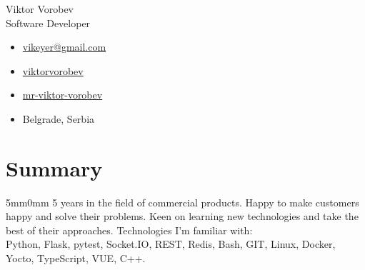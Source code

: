 \documentclass[10pt]{article}
\newcommand{\lmvalue}{5mm}
\newcommand{\rmvalue}{0mm}
\begin{document}
    \begin{minipage}{0.78\linewidth}
    {\fontsize{28pt}{28pt}\selectfont Viktor Vorobev}
        \\[1em]
        {\color{gray}\fontsize{16pt}{16pt}\selectfont Software Developer}
    \end{minipage}
    \hfill%
    \begin{minipage}{0.24\linewidth}
        \begin{flushleft}
            \begin{itemize}
                \item[\color{cyan}\faEnvelope] \href{mailto:vikeyer@gmail.com}{vikeyer@gmail.com}
                \item[\color{cyan}\faGithub] \href{https://github.com/viktorvorobev}{viktorvorobev}
                \item[\color{cyan}\faLinkedin] \href{https://www.linkedin.com/in/mr-viktor-vorobev/}{mr-viktor-vorobev}
                \item[\faBuildingO] Belgrade, Serbia
            \end{itemize}
        \end{flushleft}
    \end{minipage}

    \vspace{3mm}
    \section*{Summary}
    \begin{changemargin}{\lmvalue}{\rmvalue}
        5 years in the field of commercial products.
        Happy to make customers happy and solve their problems.
        Keen on learning new technologies and take the best of their approaches.
        Technologies I'm familiar with:\\
        Python, Flask, pytest, Socket.IO, REST, Redis, Bash, GIT, Linux,
        Docker, Yocto, TypeScript, VUE, C++.
    \end{changemargin}
\end{document}
